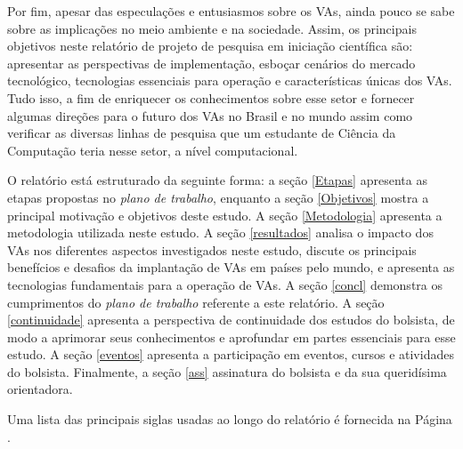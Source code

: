 \documentclass[
	12pt,				%
	openany, %
	a4paper,			%
	english,			%
	french,				%
	spanish,			%
	brazil				%
	]{abntex2}
\begin{document}
Por fim, apesar das especulações e entusiasmos sobre os VAs, ainda pouco se sabe sobre as implicações no meio ambiente e na sociedade. Assim, os principais objetivos neste relatório de projeto de pesquisa em iniciação científica são: apresentar as perspectivas de implementação, esboçar cenários do mercado tecnológico, tecnologias essenciais para operação e características únicas dos VAs. Tudo isso, a fim de enriquecer os conhecimentos sobre esse setor e fornecer algumas direções para o futuro dos VAs no Brasil e no mundo assim como verificar as diversas linhas de pesquisa que um estudante de Ciência da Computação teria nesse setor, a nível computacional.

O relatório está estruturado da seguinte forma: a seção \ref{Etapas} apresenta as etapas propostas no \textit{plano de trabalho}, enquanto a seção \ref{Objetivos} mostra a principal motivação e objetivos deste estudo. A seção \ref{Metodologia} apresenta a metodologia utilizada neste estudo. A seção \ref{resultados} analisa o impacto dos VAs nos diferentes aspectos investigados neste estudo, discute os principais benefícios e desafios da implantação de VAs em países pelo mundo, e apresenta as tecnologias fundamentais para a operação de VAs. A seção \ref{concl} demonstra os cumprimentos do \textit{plano de trabalho} referente a este relatório. A seção \ref{continuidade} apresenta a perspectiva de continuidade dos estudos do bolsista, de modo a aprimorar seus conhecimentos e aprofundar em partes essenciais para esse estudo. A seção \ref{eventos} apresenta a participação em eventos, cursos e atividades do bolsista. Finalmente, a seção \ref{ass} assinatura do bolsista e da sua queridísima orientadora.


Uma lista das principais siglas usadas ao longo do relatório é fornecida na Página \pageref{eq:1}.






%




\end{document}

